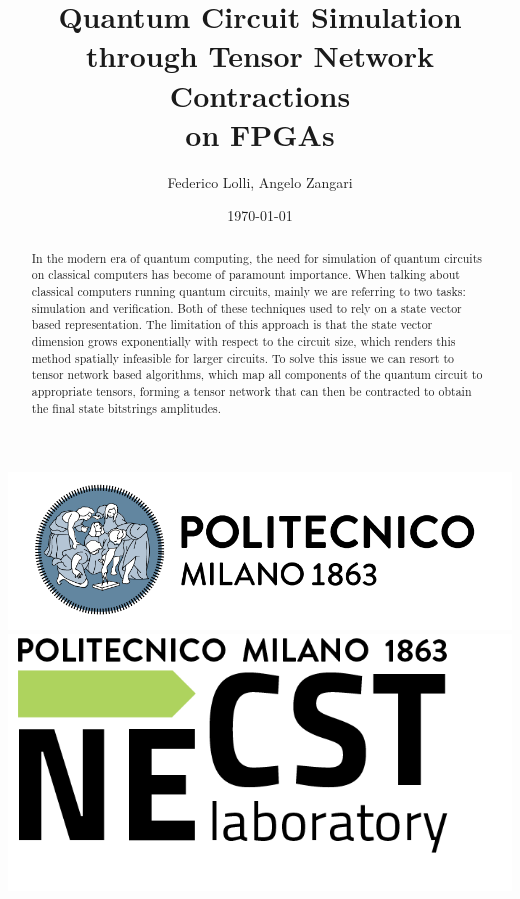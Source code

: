 \documentclass[12pt,oneside,a4paper]{article}
\title{\textbf{Quantum Circuit Simulation through Tensor Network Contractions \\ on FPGAs}}
\author{Federico Lolli, Angelo Zangari}
\date{\today}
\begin{document}
\begin{titlepage}
    \centering
    \clearpage
    \maketitle
	\thispagestyle{empty}
	\vspace*{1cm}
	\vfill
	\centering
	\includegraphics{logo_polimi.png}\includegraphics{logo_NECST.png}
\end{titlepage}

\begin{abstract}
In the modern era of quantum computing, the need for simulation of quantum circuits on classical computers has become of paramount importance. When talking about classical computers running quantum circuits, mainly we are referring to two tasks: simulation and verification. Both of these techniques used to rely on a state vector based representation. The limitation of this approach is that the state vector dimension grows exponentially with respect to the circuit size, which renders this method spatially infeasible for larger circuits. To solve this issue we can resort to tensor network based algorithms, which map all components of the quantum circuit to appropriate tensors, forming a tensor network that can then be contracted to obtain the final state bitstrings amplitudes.
\end{abstract}
\end{document}
